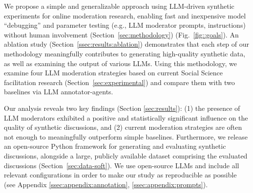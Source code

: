 We propose a simple and generalizable approach using \ac{LLM}-driven synthetic experiments for online moderation research, enabling fast and inexpensive model “debugging” and parameter testing (e.g.,  \ac{LLM} moderator prompts, instructions) without human involvement (Section~\ref{sec:methodology}) (Fig.~\ref{fig::goals}). An ablation study (Section~\ref{ssec:results:ablation}) demonstrates that each step of our methodology meaningfully contributes to generating high-quality synthetic data, as well as examining the output of various \acp{LLM}. Using this methodology, we examine four \ac{LLM} moderation strategies based on current Social Science facilitation research (Section~\ref{sec:experimental})
and compare them with two baselines via \ac{LLM} annotator-agents.

Our analysis reveals two key findings (Section \ref{sec:results}): (1) the presence of \ac{LLM} moderators exhibited a positive and statistically significant influence on the quality of synthetic discussions, and (2) current moderation strategies are often not enough to meaningfully outperform simple baselines. %
Furthermore, we release \syndisco an open-source Python framework for generating and evaluating synthetic discussions, alongside \vmd\datasetlink a large, publicly available dataset comprising the evaluated discussions (Section~\ref{sec:data-soft}). %
We use open-source \acp{LLM} and include all relevant configurations in order to make our study as reproducible as possible (see Appendix \ref{ssec:appendix:annotation}, \ref{ssec:appendix:prompts}).
